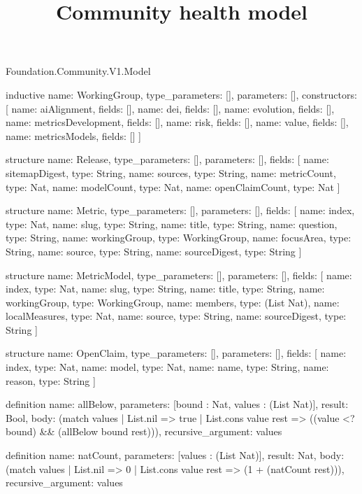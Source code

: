 \begin{lexlean}{Foundation.Community.V1.Model}
\title{Community health model}
\begin{semanticmodule}
inductive{
  name: WorkingGroup,
  type_parameters: [],
  parameters: [],
  constructors: [
    {name: aiAlignment, fields: []},
    {name: dei, fields: []},
    {name: evolution, fields: []},
    {name: metricsDevelopment, fields: []},
    {name: risk, fields: []},
    {name: value, fields: []},
    {name: metricsModels, fields: []}
  ]
}

structure{
  name: Release,
  type_parameters: [],
  parameters: [],
  fields: [
    {name: sitemapDigest, type: String},
    {name: sources, type: String},
    {name: metricCount, type: Nat},
    {name: modelCount, type: Nat},
    {name: openClaimCount, type: Nat}
  ]
}

structure{
  name: Metric,
  type_parameters: [],
  parameters: [],
  fields: [
    {name: index, type: Nat},
    {name: slug, type: String},
    {name: title, type: String},
    {name: question, type: String},
    {name: workingGroup, type: WorkingGroup},
    {name: focusArea, type: String},
    {name: source, type: String},
    {name: sourceDigest, type: String}
  ]
}

structure{
  name: MetricModel,
  type_parameters: [],
  parameters: [],
  fields: [
    {name: index, type: Nat},
    {name: slug, type: String},
    {name: title, type: String},
    {name: workingGroup, type: WorkingGroup},
    {name: members, type: (List Nat)},
    {name: localMeasures, type: Nat},
    {name: source, type: String},
    {name: sourceDigest, type: String}
  ]
}

structure{
  name: OpenClaim,
  type_parameters: [],
  parameters: [],
  fields: [
    {name: index, type: Nat},
    {name: model, type: Nat},
    {name: name, type: String},
    {name: reason, type: String}
  ]
}

definition{
  name: allBelow,
  parameters: [bound : Nat, values : (List Nat)],
  result: Bool,
  body: (match values
    | List.nil => true
    | List.cons value rest => ((value <? bound) && (allBelow bound rest))),
  recursive_argument: values
}

definition{
  name: natCount,
  parameters: [values : (List Nat)],
  result: Nat,
  body: (match values | List.nil => 0 | List.cons value rest => (1 + (natCount rest))),
  recursive_argument: values
}


\end{semanticmodule}
\end{lexlean}
